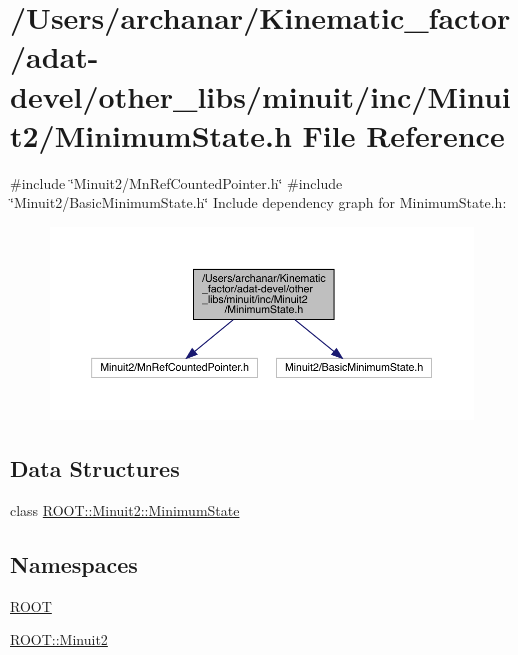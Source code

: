 \hypertarget{adat-devel_2other__libs_2minuit_2inc_2Minuit2_2MinimumState_8h}{}\section{/\+Users/archanar/\+Kinematic\+\_\+factor/adat-\/devel/other\+\_\+libs/minuit/inc/\+Minuit2/\+Minimum\+State.h File Reference}
\label{adat-devel_2other__libs_2minuit_2inc_2Minuit2_2MinimumState_8h}
{\ttfamily \#include \char`\"{}Minuit2/\+Mn\+Ref\+Counted\+Pointer.\+h\char`\"{}}\newline
{\ttfamily \#include \char`\"{}Minuit2/\+Basic\+Minimum\+State.\+h\char`\"{}}\newline
Include dependency graph for Minimum\+State.\+h\+:
\nopagebreak
\begin{figure}[H]
\begin{center}
\leavevmode
\includegraphics[width=350pt]{d2/d1d/adat-devel_2other__libs_2minuit_2inc_2Minuit2_2MinimumState_8h__incl}
\end{center}
\end{figure}
\subsection*{Data Structures}
\begin{DoxyCompactItemize}
\item 
class \mbox{\hyperlink{classROOT_1_1Minuit2_1_1MinimumState}{R\+O\+O\+T\+::\+Minuit2\+::\+Minimum\+State}}
\end{DoxyCompactItemize}
\subsection*{Namespaces}
\begin{DoxyCompactItemize}
\item 
 \mbox{\hyperlink{namespaceROOT}{R\+O\+OT}}
\item 
 \mbox{\hyperlink{namespaceROOT_1_1Minuit2}{R\+O\+O\+T\+::\+Minuit2}}
\end{DoxyCompactItemize}
